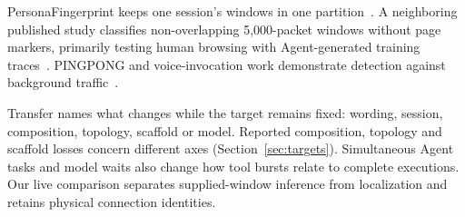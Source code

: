PersonaFingerprint keeps one session's windows in one partition~\cite{song2026personafingerprint}. A neighboring published study classifies non-overlapping 5,000-packet windows without page markers, primarily testing human browsing with Agent-generated training traces~\cite{song2026redefining}. PINGPONG and voice-invocation work demonstrate detection against background traffic~\cite{trimananda2020pingpong,ahmed2023voice}.

Transfer names what changes while the target remains fixed: wording, session, composition, topology, scaffold or model. Reported composition, topology and scaffold losses concern different axes (Section~\ref{sec:targets}). Simultaneous Agent tasks and model waits also change how tool bursts relate to complete executions. Our live comparison separates supplied-window inference from localization and retains physical connection identities.
